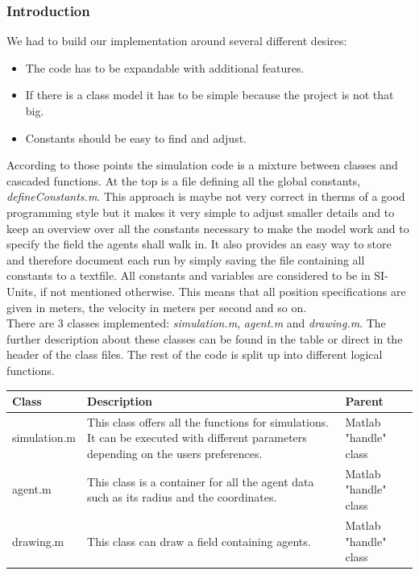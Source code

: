 \subsubsection{Introduction}
We had to build our implementation around several different desires:
\begin{itemize}
\item The code has to be expandable with additional features.
\item If there is a class model it has to be simple because the project
is not that big.
\item Constants should be easy to find and adjust.
\end{itemize}
\noi According to those points the simulation code is a mixture between classes and cascaded functions. At the top is a file defining all the global constants, \textit{defineConstants.m}. This approach is maybe not very correct in therms of a good programming style but it makes it very simple to adjust smaller details and to keep an overview over all the constants necessary to make the model work and to specify the field the agents shall walk in. It also provides an easy way to store and therefore document each run by simply saving the file containing all constants to a textfile. All constants and variables are considered to be in SI-Units, if not mentioned otherwise. This means that all position specifications are given in meters, the velocity in meters per second and so on.\\

\noi There are 3 classes implemented: \textit{simulation.m}, \textit{agent.m} and \textit{drawing.m}. The further description about these classes can be found in the table or direct in the header of the class files. The rest of the code is split up into different logical functions.\\

\begin{tabular}{|l|p{7cm}|l|}
        \hline
        Class & Description & Parent \\ \hline
        simulation.m
		& This class offers all the functions for simulations. It can be executed  
		with different parameters depending on the users preferences.           
		& Matlab "handle" class \\ \hline

		agent.m    
		& This class is a container for all the agent data such as its radius and 
		the coordinates.   
		& Matlab "handle" class \\ \hline


		drawing.m
		& This class can draw a field containing agents.           
		& Matlab "handle" class \\  \hline

\end{tabular}\\


